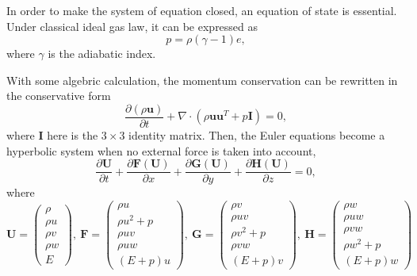 In order to make the system of equation closed, an equation of state is 
essential. 
Under classical ideal gas law, it can be expressed as 
\begin{equation}
p=\rho (\gamma -1) e, 
\label{eqn:equation_of_state}
\end{equation}
where $\gamma$ is the adiabatic index. 

With some algebric calculation, the momentum conservation can be 
rewritten in the conservative form 
\begin{equation}
\frac{\partial (\rho \mathbf{u})}{\partial t} + \nabla \cdot (\rho \mathbf{u} \mathbf{u}^{T} +  p\mathbf{I}) = 0,
\end{equation}
where $\mathbf{I}$ here is the $3\times3$ identity matrix.
Then, the Euler equations become a hyperbolic system when no external 
force is taken into account, 
\begin{equation}
\frac{\partial \mathbf{U}}{\partial t} + \frac{\partial \mathbf{F}(\mathbf{U})}{\partial x} + \frac{\partial \mathbf{G}(\mathbf{U})}{\partial y} + \frac{\partial \mathbf{H}(\mathbf{U})}{\partial z} = 0, 
\label{eqn:Euler_eqns_con}
\end{equation}
where 
\begin{equation}
\mathbf{U} = 
\left(
\begin{array}{c}
\rho \\ \rho u \\ \rho v \\ \rho w \\ E
\end{array}
\right),\ 
\mathbf{F} = 
\left(
\begin{array}{c}
\rho u \\ \rho u^2 + p \\ \rho u v \\ \rho u w \\ (E+p)u
\end{array}
\right),\ 
\mathbf{G} = 
\left(
\begin{array}{c}
\rho v \\ \rho u v \\ \rho v^2 + p \\ \rho v w \\ (E+p)v
\end{array}
\right),\ 
\mathbf{H} = 
\left(
\begin{array}{c}
\rho w \\ \rho u w \\ \rho v w \\ \rho w^2 + p \\ (E+p)w
\end{array}
\right)
\end{equation}

